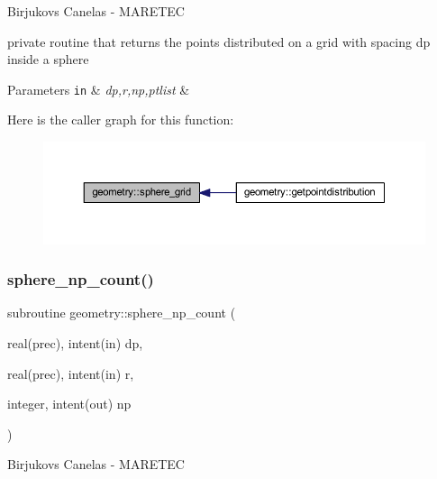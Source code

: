 Birjukovs Canelas -\/ M\+A\+R\+E\+T\+EC 

private routine that returns the points distributed on a grid with spacing dp inside a sphere 
\begin{DoxyParams}[1]{Parameters}
\mbox{\tt in}  & {\em dp,r,np,ptlist} & \\
\hline
\end{DoxyParams}
Here is the caller graph for this function\+:\nopagebreak
\begin{figure}[H]
\begin{center}
\leavevmode
\includegraphics[width=350pt]{namespacegeometry_a9629040285de7053d42f434333528702_icgraph}
\end{center}
\end{figure}
\mbox{\label{namespacegeometry_a4f070ef95bffe3bbb21bd251ae5ca6c7}} 
\subsubsection{\texorpdfstring{sphere\+\_\+np\+\_\+count()}{sphere\_np\_count()}}
{\footnotesize\ttfamily subroutine geometry\+::sphere\+\_\+np\+\_\+count (\begin{DoxyParamCaption}\item[{real(prec), intent(in)}]{dp,  }\item[{real(prec), intent(in)}]{r,  }\item[{integer, intent(out)}]{np }\end{DoxyParamCaption})\hspace{0.3cm}{\ttfamily [private]}}



Birjukovs Canelas -\/ M\+A\+R\+E\+T\+EC 

